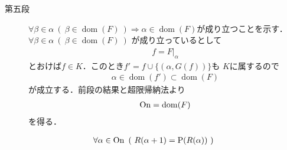 \begin{prf}
\begin{description}
			\item[第五段] $\forall \beta \in \alpha\ (\ \beta \in \operatorname{dom}(F)\ )
				\Longrightarrow \alpha \in \operatorname{dom}(F)$が成り立つことを示す．
				$\forall \beta \in \alpha\ (\ \beta \in \operatorname{dom}(F)\ )$
				が成り立っているとして
				\begin{align}
					f = F|_\alpha
				\end{align}
				とおけば$f \in K$．このとき$f' = f \cup \{(\alpha,G(f))\}$も
				$K$に属するので
				\begin{align}	
					\alpha \in \operatorname{dom}(f') \subset
					\operatorname{dom}(F)
				\end{align}
				が成立する．前段の結果と超限帰納法より
				\begin{align}
					\mathrm{On} = \operatorname{dom}(F)
				\end{align}
				を得る．
		\end{description}
	\end{prf}
	
	\begin{screen}
		\begin{thm}
			\begin{align}\label{thm:R_alpha_plus_1_equals_to_power_of_R_alpha}
				\forall \alpha \in \ON\ 
				\left(\ R(\alpha + 1) = \operatorname{P}(R(\alpha))\ \right)
			\end{align}
		\end{thm}
	\end{screen}
	
